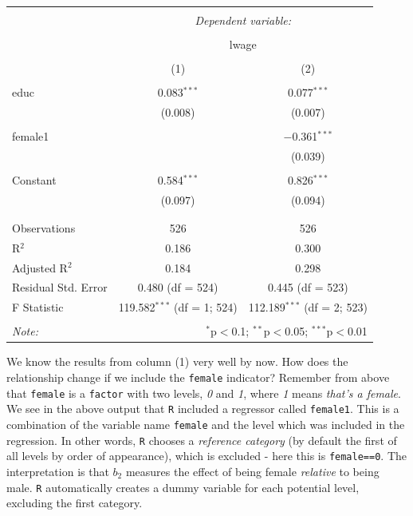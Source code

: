 \documentclass[]{book}
\begin{document}
\begin{table}[!htbp] \centering 
  \caption{} 
  \label{} 
\begin{tabular}{@{\extracolsep{5pt}}lcc} 
\\[-1.8ex]\hline 
\hline \\[-1.8ex] 
 & \multicolumn{2}{c}{\textit{Dependent variable:}} \\ 
\cline{2-3} 
\\[-1.8ex] & \multicolumn{2}{c}{lwage} \\ 
\\[-1.8ex] & (1) & (2)\\ 
\hline \\[-1.8ex] 
 educ & 0.083$^{***}$ & 0.077$^{***}$ \\ 
  & (0.008) & (0.007) \\ 
  & & \\ 
 female1 &  & $-$0.361$^{***}$ \\ 
  &  & (0.039) \\ 
  & & \\ 
 Constant & 0.584$^{***}$ & 0.826$^{***}$ \\ 
  & (0.097) & (0.094) \\ 
  & & \\ 
\hline \\[-1.8ex] 
Observations & 526 & 526 \\ 
R$^{2}$ & 0.186 & 0.300 \\ 
Adjusted R$^{2}$ & 0.184 & 0.298 \\ 
Residual Std. Error & 0.480 (df = 524) & 0.445 (df = 523) \\ 
F Statistic & 119.582$^{***}$ (df = 1; 524) & 112.189$^{***}$ (df = 2; 523) \\ 
\hline 
\hline \\[-1.8ex] 
\textit{Note:}  & \multicolumn{2}{r}{$^{*}$p$<$0.1; $^{**}$p$<$0.05; $^{***}$p$<$0.01} \\ 
\end{tabular} 
\end{table}

We know the results from column (1) very well by now. How does the relationship change if we include the \texttt{female} indicator? Remember from above that \texttt{female} is a \texttt{factor} with two levels, \emph{0} and \emph{1}, where \emph{1} means \emph{that's a female}. We see in the above output that \texttt{R} included a regressor called \texttt{female1}. This is a combination of the variable name \texttt{female} and the level which was included in the regression. In other words, \texttt{R} chooses a \emph{reference category} (by default the first of all levels by order of appearance), which is excluded - here this is \texttt{female==0}. The interpretation is that \(b_2\) measures the effect of being female \emph{relative} to being male. \texttt{R} automatically creates a dummy variable for each potential level, excluding the first category.
\end{document}

